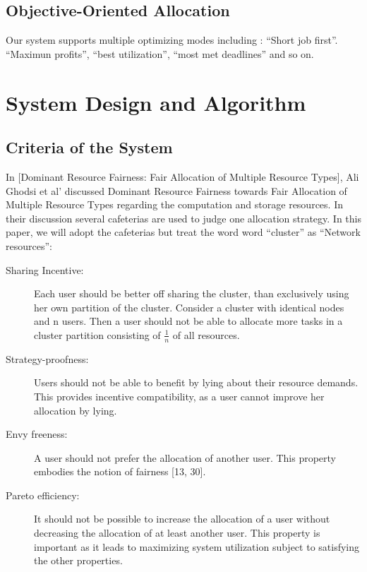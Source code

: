 \documentclass[a4paper,11pt,twocolumn]{article}
\begin{document}
\subsection{Objective-Oriented Allocation}
Our system supports multiple optimizing modes including : ``Short job first''. ``Maximun profits'', ``best utilization'',
``most met deadlines'' and so on.


\section{System Design and Algorithm}
\subsection{Criteria of the System}
In [Dominant Resource Fairness: Fair Allocation of Multiple Resource Types], Ali Ghodsi et al'\cite{ali} discussed Dominant Resource Fairness towards 
Fair Allocation of Multiple Resource Types regarding the computation and storage resources. In their discussion several cafeterias
are used to judge one allocation strategy. In this paper, we will adopt the cafeterias but treat the word  word ``cluster'' as ``Network resources'':

\begin{description}

\item 
[Sharing Incentive:]
Each user should be better off
sharing the cluster, than exclusively using her own
partition of the cluster. Consider a cluster with identical nodes and n users. Then a user should not be
able to allocate more tasks in a cluster partition consisting of $\frac{1}{n}$ of all resources.

\item 
[Strategy-proofness:]
Users should not be able to
benefit by lying about their resource demands. This
provides incentive compatibility, as a user cannot
improve her allocation by lying.

\item 
[Envy freeness:]
A user should not prefer the allocation of another user. This property embodies the
notion of fairness [13, 30].

\item 
[Pareto efficiency:]
It should not be possible to increase the allocation of a user without decreasing
the allocation of at least another user. This property is important as it leads to maximizing system
utilization subject to satisfying the other properties.

\end{description}
\end{document}

